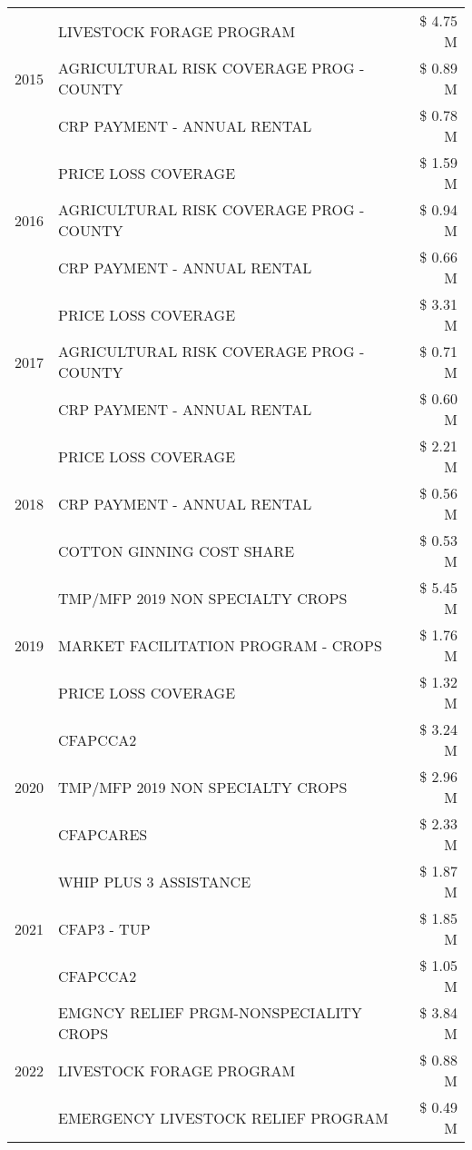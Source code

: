 \begin{tabular}{llr}
\cline{1-3}
\multirow[t]{3}{*}{2015} & LIVESTOCK FORAGE PROGRAM & \$ 4.75 M \\
 & AGRICULTURAL RISK COVERAGE PROG - COUNTY & \$ 0.89 M \\
 & CRP PAYMENT - ANNUAL RENTAL & \$ 0.78 M \\
\cline{1-3}
\multirow[t]{3}{*}{2016} & PRICE LOSS COVERAGE & \$ 1.59 M \\
 & AGRICULTURAL RISK COVERAGE PROG - COUNTY & \$ 0.94 M \\
 & CRP PAYMENT - ANNUAL RENTAL & \$ 0.66 M \\
\cline{1-3}
\multirow[t]{3}{*}{2017} & PRICE LOSS COVERAGE & \$ 3.31 M \\
 & AGRICULTURAL RISK COVERAGE PROG - COUNTY & \$ 0.71 M \\
 & CRP PAYMENT - ANNUAL RENTAL & \$ 0.60 M \\
\cline{1-3}
\multirow[t]{3}{*}{2018} & PRICE LOSS COVERAGE & \$ 2.21 M \\
 & CRP PAYMENT - ANNUAL RENTAL & \$ 0.56 M \\
 & COTTON GINNING COST SHARE & \$ 0.53 M \\
\cline{1-3}
\multirow[t]{3}{*}{2019} & TMP/MFP 2019 NON SPECIALTY CROPS & \$ 5.45 M \\
 & MARKET FACILITATION PROGRAM - CROPS & \$ 1.76 M \\
 & PRICE LOSS COVERAGE & \$ 1.32 M \\
\cline{1-3}
\multirow[t]{3}{*}{2020} & CFAPCCA2 & \$ 3.24 M \\
 & TMP/MFP 2019 NON SPECIALTY CROPS & \$ 2.96 M \\
 & CFAPCARES & \$ 2.33 M \\
\cline{1-3}
\multirow[t]{3}{*}{2021} & WHIP PLUS 3 ASSISTANCE & \$ 1.87 M \\
 & CFAP3 - TUP & \$ 1.85 M \\
 & CFAPCCA2 & \$ 1.05 M \\
\cline{1-3}
\multirow[t]{3}{*}{2022} & EMGNCY RELIEF PRGM-NONSPECIALITY CROPS & \$ 3.84 M \\
 & LIVESTOCK FORAGE PROGRAM & \$ 0.88 M \\
 & EMERGENCY LIVESTOCK RELIEF PROGRAM & \$ 0.49 M \\
\cline{1-3}
\bottomrule
\end{tabular}

